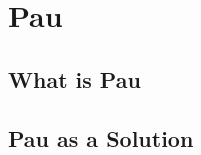 \section{Pau} \label{sec:pau}

\iffalse
outline and notes

We propose pau
	
\fi
\subsection{What is Pau}
\subsection{Pau as a Solution}
